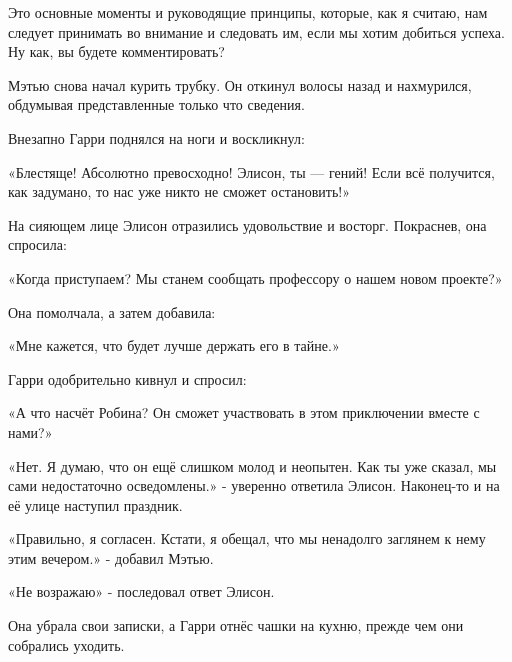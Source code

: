 \documentclass[a4paper,12pt]{book}
\begin{document}
\par
Это основные моменты и руководящие принципы, которые, как я считаю, нам следует принимать во внимание и следовать им, если мы хотим добиться успеха. Ну как, вы будете комментировать?\\
\par
Мэтью снова начал курить трубку. Он откинул волосы назад и нахмурился, обдумывая представленные только что сведения.\\
\par
Внезапно Гарри поднялся на ноги и воскликнул:
\par
«Блестяще! Абсолютно превосходно! Элисон, ты — гений! Если всё получится, как задумано, то нас уже никто не сможет остановить!»
\par
На сияющем лице Элисон отразились удовольствие и восторг. Покраснев, она спросила:
\par
«Когда приступаем? Мы станем сообщать профессору о нашем новом проекте?»
\par
Она помолчала, а затем добавила:
\par
«Мне кажется, что будет лучше держать его в тайне.»
\par
Гарри одобрительно кивнул и спросил:
\par
«А что насчёт Робина? Он сможет участвовать в этом приключении вместе с нами?»
\par
«Нет. Я думаю, что он ещё слишком молод и неопытен. Как ты уже сказал, мы сами недостаточно осведомлены.» - уверенно ответила Элисон. Наконец-то и на её улице наступил праздник.
\par
«Правильно, я согласен. Кстати, я обещал, что мы ненадолго заглянем к нему этим вечером.» - добавил Мэтью.
\par
«Не возражаю» - последовал ответ Элисон.\\
\par
Она убрала свои записки, а Гарри отнёс чашки на кухню, прежде чем они собрались уходить.
\end{document}
